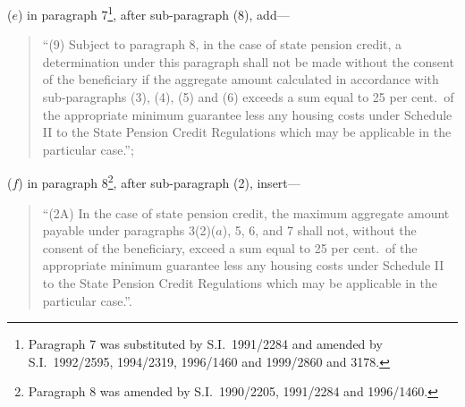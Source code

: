 \documentclass[12pt,a4paper]{article}
\begin{document}
\begin{enumerate}
($e$) in paragraph 7\footnote{Paragraph 7 was substituted by S.I.\ 1991/2284 and amended by S.I.\ 1992/2595, 1994/2319, 1996/1460 and 1999/2860 and 3178.}, after sub-paragraph (8), add—
\begin{quotation}
“(9) Subject to paragraph 8, in the case of state pension credit, a determination under this paragraph shall not be made without the consent of the beneficiary if the aggregate amount calculated in accordance with sub-paragraphs (3), (4), (5) and (6) exceeds a sum equal to 25 per cent.\ of the appropriate minimum guarantee less any housing costs under Schedule II to the State Pension Credit Regulations which may be applicable in the particular case.”;
\end{quotation}

($f$) in paragraph 8\footnote{Paragraph 8 was amended by S.I.\ 1990/2205, 1991/2284 and 1996/1460.}, after sub-paragraph (2), insert—
\begin{quotation}
“(2A) In the case of state pension credit, the maximum aggregate amount payable under paragraphs 3(2)($a$), 5, 6, and 7 shall not, without the consent of the beneficiary, exceed a sum equal to 25 per cent.\ of the appropriate minimum guarantee less any housing costs under Schedule II to the State Pension Credit Regulations which may be applicable in the particular case.”.
\end{quotation}
\end{enumerate}
\end{document}
